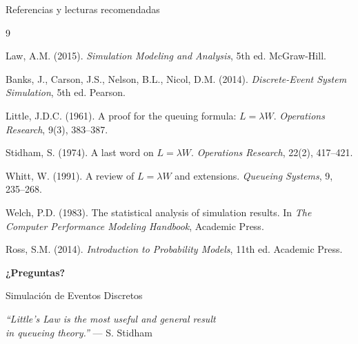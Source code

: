 \documentclass[aspectratio=1610, 9pt]{beamer}
\begin{document}
\begin{frame}{Referencias y lecturas recomendadas}

\begin{thebibliography}{9}
\small

 Law, A.M. (2015). \textit{Simulation Modeling and Analysis}, 5th ed. McGraw-Hill.

 Banks, J., Carson, J.S., Nelson, B.L., Nicol, D.M. (2014). \textit{Discrete-Event System Simulation}, 5th ed. Pearson.

 Little, J.D.C. (1961). A proof for the queuing formula: $L = \lambda W$. \textit{Operations Research}, 9(3), 383--387.

 Stidham, S. (1974). A last word on $L = \lambda W$. \textit{Operations Research}, 22(2), 417--421.

 Whitt, W. (1991). A review of $L = \lambda W$ and extensions. \textit{Queueing Systems}, 9, 235--268.

 Welch, P.D. (1983). The statistical analysis of simulation results. In \textit{The Computer Performance Modeling Handbook}, Academic Press.

 Ross, S.M. (2014). \textit{Introduction to Probability Models}, 11th ed. Academic Press.

\end{thebibliography}
\end{frame}

\begin{frame}{}

\begin{center}
\vspace{1cm}
{\Huge\textbf{¿Preguntas?}}

\vspace{1cm}
{\large Simulación de Eventos Discretos}

\vspace{0.5cm}
{\large\textit{``Little's Law is the most useful and general result\\in queueing theory.''} --- S. Stidham}


\end{center}
\end{frame}
\end{document}

